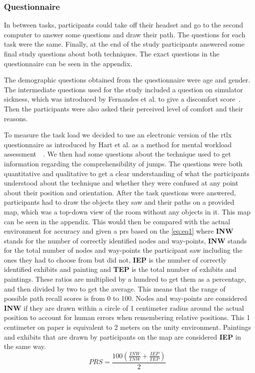 \subsubsection{Questionnaire}
\label{subsubsection DPUS SP SP: User Feedback}
In between tasks, participants could take off their headset and go to the second computer to answer some questions and draw their path. The questions for each task were the same. Finally, at the end of the study participants answered some final study questions about both techniques. The exact questions in the questionnaire can be seen in the appendix.

The demographic questions obtained from the questionnaire were age and gender. The intermediate questions used for the study included a question on simulator sickness, which was introduced by Fernandes et al. to give a discomfort score~\cite{Fernandes2016}. Then the participants were also asked their perceived level of comfort and their reasons.

To measure the task load we decided to use an electronic version of the \acrfull{rtlx} questionnaire as introduced by Hart et al. as a method for mental workload assessment~\cite{Hart1988}~\cite{Hart2006}. We then had some questions about the technique used to get information regarding the comprehensibility of jumps. The questions were both quantitative and qualitative to get a clear understanding of what the participants understood about the technique and whether they were confused at any point about their position and orientation. After the task questions were answered, participants had to draw the objects they saw and their paths on a provided map, which was a top-down view of the room without any objects in it. This map can be seen in the appendix. This would then be compared with the actual environment for accuracy and given a \acrfull{prs} based on the \cref{eq:eq1} where \textbf{INW} stands for the number of correctly identified nodes and way-points, \textbf{INW} stands for the total number of nodes and way-points the participant saw including the ones they had to choose from but did not, \textbf{IEP} is the number of correctly identified exhibits and painting and \textbf{TEP} is the total number of exhibits and paintings. These ratios are multiplied by a hundred to get them as a percentage, and then divided by two to get the average. This means that the range of possible path recall scores is from 0 to 100. Nodes and way-points are considered \textbf{INW} if they are drawn within a circle of 1 centimeter radius around the actual position to account for human errors when remembering relative positions. This 1 centimeter on paper is equivalent to 2 meters on the unity environment. Paintings and exhibits that are drawn by participants on the map are considered \textbf{IEP} in the same way. 
\begin{equation}
	\label{eq:eq1}
	PRS = \frac{100\left(\frac{INW}{TNW} + \frac{IEP}{TEP}\right)}{2}
\end{equation}

